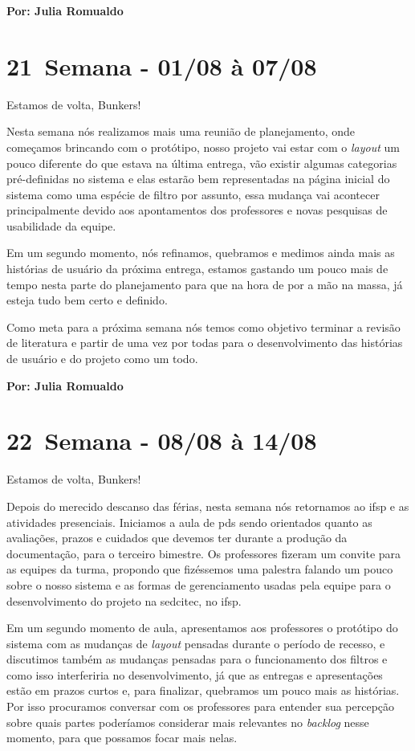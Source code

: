 \textbf{Por: Julia Romualdo}

\section{21\textordfeminine \, Semana - 01/08 à 07/08}
Estamos de volta, Bunkers!

Nesta semana nós realizamos mais uma reunião de planejamento, onde começamos brincando com o protótipo, nosso projeto vai estar com o \textit{layout} um pouco diferente do que estava na última entrega, vão existir algumas categorias pré-definidas no sistema e elas estarão bem representadas na página inicial do sistema como uma espécie de filtro por assunto, essa mudança vai acontecer principalmente devido aos apontamentos dos professores e novas pesquisas de usabilidade da equipe. 

Em um segundo momento, nós refinamos, quebramos e medimos ainda mais as histórias de usuário da próxima entrega, estamos gastando um pouco mais de tempo nesta parte do planejamento para que na hora de por a mão na massa, já esteja tudo bem certo e definido.

Como meta para a próxima semana nós temos como objetivo terminar a revisão de literatura e partir de uma vez por todas para o desenvolvimento das histórias de usuário e do projeto como um todo.

\textbf{Por: Julia Romualdo}

\section{22\textordfeminine \, Semana - 08/08 à 14/08}
Estamos de volta, Bunkers!

Depois do merecido descanso das férias, nesta semana nós retornamos ao \acs{ifsp} e as atividades presenciais. Iniciamos a aula de \acs{pds} sendo orientados quanto as avaliações, prazos e cuidados que devemos ter durante a produção da documentação, para o terceiro bimestre. Os professores fizeram um convite para as equipes da turma, propondo que fizéssemos uma palestra falando um pouco sobre o nosso sistema e as formas de gerenciamento usadas pela equipe para o desenvolvimento do projeto na \gls{sedcitec}, no \acs{ifsp}. 

Em um segundo momento de aula, apresentamos aos professores o protótipo do sistema com as mudanças de \textit{layout} pensadas durante o período de recesso, e discutimos também as mudanças pensadas para o funcionamento dos filtros e como isso interferiria no desenvolvimento, já que as entregas e apresentações estão em prazos curtos e, para finalizar, quebramos um pouco mais as histórias. Por isso procuramos conversar com os professores para entender sua percepção sobre quais partes poderíamos considerar mais relevantes no \textit{backlog} nesse momento, para que possamos focar mais nelas.

